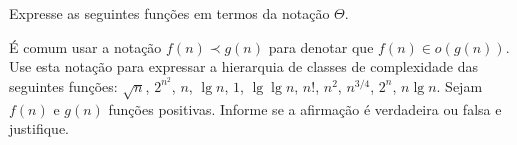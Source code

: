 \documentclass[a4paper]{exam}
\begin{document}
\begin{questions}
  \question Expresse as seguintes funções em termos da notação $\Theta$.
  \question É comum usar a notação $f(n) \prec g(n)$ para denotar que
  $f(n) \in o(g(n))$. Use esta notação para expressar a
  hierarquia de classes de complexidade das seguintes funções:
  $\sqrt{n}$, $2^{n^2}$, $n$, $\lg n$, $1$, $\lg \lg n$, $n!$, $n^2$, $n^{3/4}$, $2^n$, $n \lg n$.
  \question Sejam $f(n)$ e $g(n)$ funções positivas. Informe se a
  afirmação é verdadeira ou falsa e justifique.
\end{questions}
\end{document}
